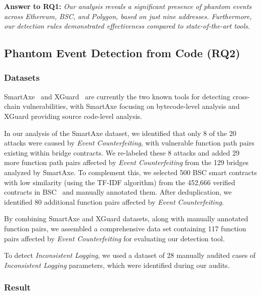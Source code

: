 \vspace{\baselineskip}
\begin{mdframed}
\noindent\textbf{Answer to RQ1:} \textit{Our analysis reveals a significant presence of phantom events across Ethereum, BSC, and Polygon, based on just nine addresses. Furthermore, our detection rules demonstrated effectiveness compared to state-of-the-art tools.}
\end{mdframed}

\subsection{Phantom Event Detection from Code (RQ2)}

\subsubsection{Datasets}
SmartAxe~\cite{liao2024smartaxe} and XGuard~\cite{wang2024xguard} are currently the two known tools for detecting cross-chain vulnerabilities, with SmartAxe focusing on bytecode-level analysis and XGuard providing source code-level analysis.

In our analysis of the SmartAxe dataset, we identified that only 8 of the 20 attacks were caused by \emph{Event Counterfeiting}, with vulnerable function path pairs existing within bridge contracts. We re-labeled these 8 attacks and added 29 more function path pairs affected by \emph{Event Counterfeiting} from the 129 bridges analyzed by SmartAxe. To complement this, we selected 500 BSC smart contracts with low similarity (using the TF-IDF algorithm) from the 452,666 verified contracts in BSC~\cite{bscdata} and manually annotated them. After deduplication, we identified 80 additional function pairs affected by \emph{Event Counterfeiting}.

By combining SmartAxe and XGuard datasets, along with manually annotated function pairs, we assembled a comprehensive data set containing 117 function pairs affected by \emph{Event Counterfeiting} for evaluating our detection tool.

To detect \emph{Inconsistent Logging}, we used a dataset of 28 manually audited cases of \emph{Inconsistent Logging} parameters, which were identified during our audits.

\subsubsection{Result}

